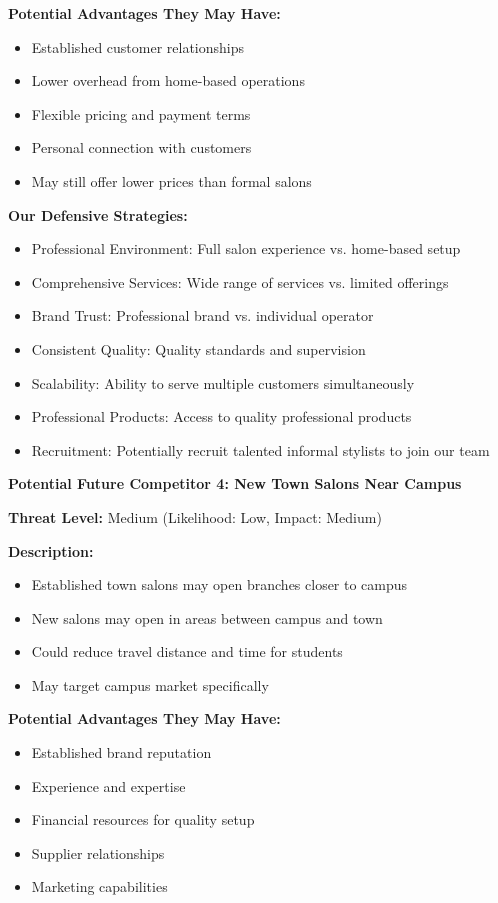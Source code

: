 \textbf{Potential Advantages They May Have:}
\begin{itemize}[leftmargin=2em]
    \item Established customer relationships
    \item Lower overhead from home-based operations
    \item Flexible pricing and payment terms
    \item Personal connection with customers
    \item May still offer lower prices than formal salons
\end{itemize}

\textbf{Our Defensive Strategies:}
\begin{itemize}[leftmargin=2em]
    \item Professional Environment: Full salon experience vs. home-based setup
    \item Comprehensive Services: Wide range of services vs. limited offerings
    \item Brand Trust: Professional brand vs. individual operator
    \item Consistent Quality: Quality standards and supervision
    \item Scalability: Ability to serve multiple customers simultaneously
    \item Professional Products: Access to quality professional products
    \item Recruitment: Potentially recruit talented informal stylists to join our team
\end{itemize}

\vspace{1em}

\textbf{Potential Future Competitor 4: New Town Salons Near Campus}

\textbf{Threat Level:} Medium (Likelihood: Low, Impact: Medium)

\textbf{Description:}
\begin{itemize}[leftmargin=2em]
    \item Established town salons may open branches closer to campus
    \item New salons may open in areas between campus and town
    \item Could reduce travel distance and time for students
    \item May target campus market specifically
\end{itemize}

\textbf{Potential Advantages They May Have:}
\begin{itemize}[leftmargin=2em]
    \item Established brand reputation
    \item Experience and expertise
    \item Financial resources for quality setup
    \item Supplier relationships
    \item Marketing capabilities
\end{itemize}

